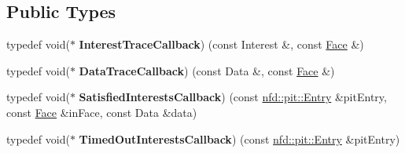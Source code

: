 \subsection*{Public Types}
\begin{DoxyCompactItemize}
\item 
typedef void($\ast$ {\bfseries Interest\+Trace\+Callback}) (const Interest \&, const \hyperlink{classnfd_1_1Face}{Face} \&)\hypertarget{classns3_1_1ndn_1_1L3Protocol_ab5b370a7a6c85bf68f6a11a87b8962af}{}\label{classns3_1_1ndn_1_1L3Protocol_ab5b370a7a6c85bf68f6a11a87b8962af}

\item 
typedef void($\ast$ {\bfseries Data\+Trace\+Callback}) (const Data \&, const \hyperlink{classnfd_1_1Face}{Face} \&)\hypertarget{classns3_1_1ndn_1_1L3Protocol_a6c030730fdf44b7e4b52eb4ff700b076}{}\label{classns3_1_1ndn_1_1L3Protocol_a6c030730fdf44b7e4b52eb4ff700b076}

\item 
typedef void($\ast$ {\bfseries Satisfied\+Interests\+Callback}) (const \hyperlink{classnfd_1_1pit_1_1Entry}{nfd\+::pit\+::\+Entry} \&pit\+Entry, const \hyperlink{classnfd_1_1Face}{Face} \&in\+Face, const Data \&data)\hypertarget{classns3_1_1ndn_1_1L3Protocol_ab37e69db1b87fc4d98c68df0bbf306b0}{}\label{classns3_1_1ndn_1_1L3Protocol_ab37e69db1b87fc4d98c68df0bbf306b0}

\item 
typedef void($\ast$ {\bfseries Timed\+Out\+Interests\+Callback}) (const \hyperlink{classnfd_1_1pit_1_1Entry}{nfd\+::pit\+::\+Entry} \&pit\+Entry)\hypertarget{classns3_1_1ndn_1_1L3Protocol_afcc85949c6978cdd5cd7f458e59be72f}{}\label{classns3_1_1ndn_1_1L3Protocol_afcc85949c6978cdd5cd7f458e59be72f}

\end{DoxyCompactItemize}

